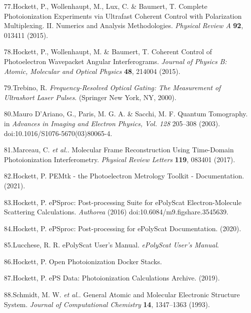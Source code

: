 \documentclass[10pt]{article}
\begin{document}
\label{csl:77}77.Hockett, P., Wollenhaupt, M., Lux, C. \& Baumert, T. {Complete Photoionization Experiments via Ultrafast Coherent Control with Polarization Multiplexing. {{II}}. {{Numerics}} and Analysis Methodologies}. \textit{Physical Review A} \textbf{92}, 013411 (2015).

\label{csl:78}78.Hockett, P., Wollenhaupt, M. \& Baumert, T. {Coherent Control of Photoelectron Wavepacket Angular Interferograms}. \textit{Journal of Physics B: Atomic, Molecular and Optical Physics} \textbf{48}, 214004 (2015).

\label{csl:79}79.Trebino, R. \textit{{Frequency-{{Resolved Optical Gating}}: {{The Measurement}} of {{Ultrashort Laser Pulses}}}}. ({Springer New York, NY}, 2000).

\label{csl:80}80.Mauro D'Ariano, G., Paris, M. G. A. \& Sacchi, M. F. {Quantum {{Tomography}}}. in \textit{Advances in {{Imaging}} and {{Electron Physics}}, {{Vol}}. 128} 205–308 (2003). doi:10.1016/S1076-5670(03)80065-4.

\label{csl:81}81.Marceau, C. \textit{et al.}. {Molecular {{Frame Reconstruction Using Time-Domain Photoionization Interferometry}}}. \textit{Physical Review Letters} \textbf{119}, 083401 (2017).

\label{csl:82}82.Hockett, P. {{{PEMtk}} - the {{Photoelectron Metrology Toolkit}} - Documentation}. (2021).

\label{csl:83}83.Hockett, P. {{{ePSproc}}: {{Post-processing}} Suite for {{ePolyScat}} Electron-Molecule Scattering Calculations}. \textit{Authorea} (2016) doi:10.6084/m9.figshare.3545639.

\label{csl:84}84.Hockett, P. {{{ePSproc}}: {{Post-processing}} for {{ePolyScat}} Documentation}. (2020).

\label{csl:85}85.Lucchese, R. R. {{{ePolyScat User}}'s {{Manual}}}. \textit{ePolyScat User's Manual}.

\label{csl:86}86.Hockett, P. {Open {{Photoionization Docker Stacks}}}.

\label{csl:87}87.Hockett, P. {{{ePS}} Data: {{Photoionization}} Calculations Archive}. (2019).

\label{csl:88}88.Schmidt, M. W. \textit{et al.}. {General Atomic and Molecular Electronic Structure System}. \textit{Journal of Computational Chemistry} \textbf{14}, 1347–1363 (1993).
\end{document}
